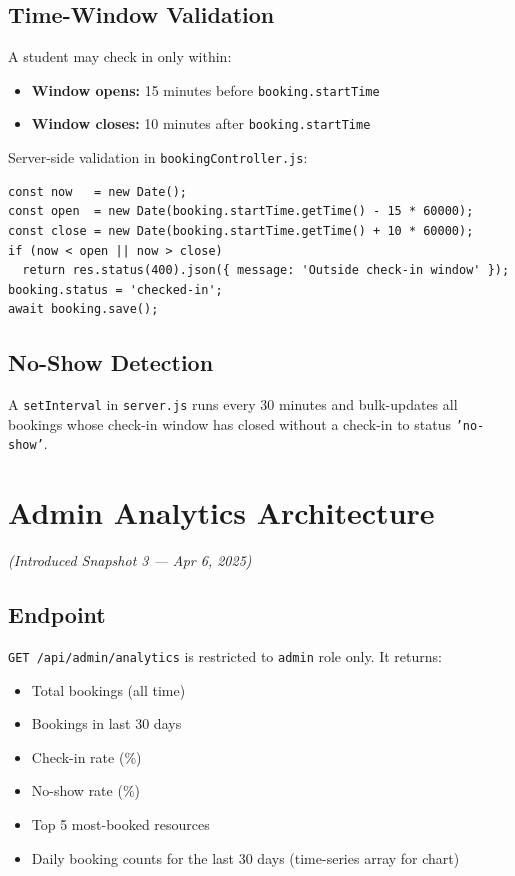 \documentclass[12pt]{article}
\begin{document}
\subsection{Time-Window Validation}
A student may check in only within:
\begin{itemize}
    \item \textbf{Window opens:} 15 minutes before \texttt{booking.startTime}
    \item \textbf{Window closes:} 10 minutes after \texttt{booking.startTime}
\end{itemize}

Server-side validation in \texttt{bookingController.js}:
\begin{verbatim}
const now   = new Date();
const open  = new Date(booking.startTime.getTime() - 15 * 60000);
const close = new Date(booking.startTime.getTime() + 10 * 60000);
if (now < open || now > close)
  return res.status(400).json({ message: 'Outside check-in window' });
booking.status = 'checked-in';
await booking.save();
\end{verbatim}

\subsection{No-Show Detection}
A \texttt{setInterval} in \texttt{server.js} runs every 30 minutes and bulk-updates all bookings whose check-in window has closed without a check-in to status \texttt{'no-show'}.

\section{Admin Analytics Architecture}
\textit{(Introduced Snapshot 3 --- Apr 6, 2025)}

\subsection{Endpoint}
\texttt{GET /api/admin/analytics} is restricted to \texttt{admin} role only. It returns:
\begin{itemize}
    \item Total bookings (all time)
    \item Bookings in last 30 days
    \item Check-in rate (\%)
    \item No-show rate (\%)
    \item Top 5 most-booked resources
    \item Daily booking counts for the last 30 days (time-series array for chart)
\end{itemize}
\end{document}
